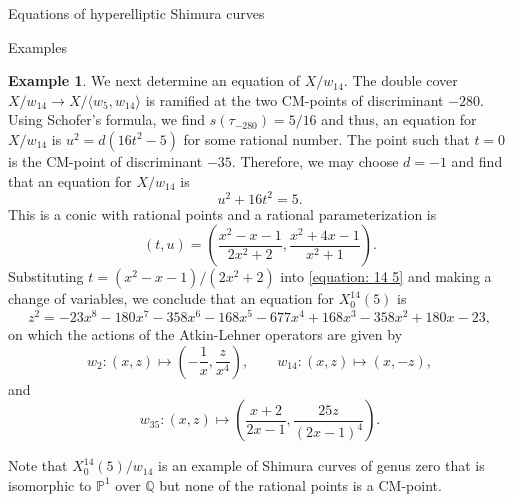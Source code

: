 \documentclass{amsart}
\newcounter{lemma}
\theoremstyle{definition}
\newtheorem{Example}[lemma]{Example}
\def\P{\mathbb P}
\def\P{\mathbb P}
\def\Q{\mathbb Q}
\def\gen#1{\langle #1\rangle}
\begin{document}
\begin{section}{Equations of hyperelliptic Shimura curves}
\begin{subsection}{Examples}
\begin{Example}
  We next determine an equation of $X/w_{14}$. The double cover
  $X/w_{14}\to X/\gen{w_5,w_{14}}$ is ramified at the two CM-points of
  discriminant $-280$. Using Schofer's formula, we find
  $s(\tau_{-280})=5/16$ and thus, an equation for $X/w_{14}$ is
  $u^2=d(16t^2-5)$ for some rational number. The point such that
  $t=0$ is the CM-point of discriminant $-35$. Therefore, we may
  choose $d=-1$ and find that an equation for $X/w_{14}$ is
  $$
    u^2+16t^2=5.
  $$
  This is a conic with rational points and a rational parameterization
  is
  $$
    (t,u)=\left(\frac{x^2-x-1}{2x^2+2},\frac{x^2+4x-1}{x^2+1}\right).
  $$
  Substituting $t=(x^2-x-1)/(2x^2+2)$ into \eqref{equation: 14 5} and
  making a change of variables, we conclude that an equation for
  $X_0^{14}(5)$ is
  $$
    z^2=-23x^8-180x^7-358x^6-168x^5-677x^4+168x^3-358x^2+180x-23,
  $$
  on which the actions of the Atkin-Lehner operators are given by
  $$
    w_2:(x,z)\mapsto\left(-\frac1x,\frac z{x^4}\right), \qquad
    w_{14}:(x,z)\mapsto(x,-z),
  $$
  and
  $$
    w_{35}:(x,z)\mapsto\left(\frac{x+2}{2x-1},\frac{25z}{(2x-1)^4}\right).
  $$

  Note that $X_0^{14}(5)/w_{14}$ is an example of Shimura curves of
  genus zero that is isomorphic to $\P^1$ over $\Q$ but none of the
  rational points is a CM-point.
\end{Example}


\end{subsection}
\end{section}
\end{document}
